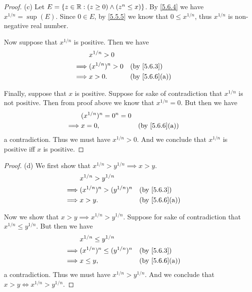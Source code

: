 \begin{proof}{(c)}
  Let \(E = \{z \in \mathbb{R} : (z \geq 0) \land (z^n \leq x)\}\).
  By \cref{5.6.4} we have \(x^{1 / n} = \sup(E)\).
  Since \(0 \in E\), by \cref{5.5.5} we know that \(0 \leq x^{1 / n}\), thus \(x^{1 / n}\) is non-negative real number.

  Now suppose that \(x^{1 / n}\) is positive.
  Then we have
  \begin{align*}
             & x^{1 / n} > 0                                      \\
    \implies & (x^{1 / n})^n > 0 &  & \text{(by \cref{5.6.3})}    \\
    \implies & x > 0.            &  & \text{(by \cref{5.6.6}(a))} \\
  \end{align*}

  Finally, suppose that \(x\) is positive.
  Suppose for sake of contradiction that \(x^{1 / n}\) is not positive.
  Then from proof above we know that \(x^{1 / n} = 0\).
  But then we have
  \begin{align*}
             & (x^{1 / n})^n = 0^n = 0                                  \\
    \implies & x = 0,                  &  & \text{(by \cref{5.6.6}(a))}
  \end{align*}
  a contradiction.
  Thus we must have \(x^{1 / n} > 0\).
  And we conclude that \(x^{1 / n}\) is positive iff \(x\) is positive.
\end{proof}

\begin{proof}{(d)}
  We first show that \(x^{1 / n} > y^{1 / n} \implies x > y\).
  \begin{align*}
             & x^{1 / n} > y^{1 / n}                                          \\
    \implies & (x^{1 / n})^n > (y^{1 / n})^n &  & \text{(by \cref{5.6.3})}    \\
    \implies & x > y.                        &  & \text{(by \cref{5.6.6}(a))}
  \end{align*}

  Now we show that \(x > y \implies x^{1 / n} > y^{1 / n}\).
  Suppose for sake of contradiction that \(x^{1 / n} \leq y^{1 / n}\).
  But then we have
  \begin{align*}
             & x^{1 / n} \leq y^{1 / n}                                          \\
    \implies & (x^{1 / n})^n \leq (y^{1 / n})^n &  & \text{(by \cref{5.6.3})}    \\
    \implies & x \leq y,                        &  & \text{(by \cref{5.6.6}(a))}
  \end{align*}
  a contradiction.
  Thus we must have \(x^{1 / n} > y^{1 / n}\).
  And we conclude that \(x > y \iff x^{1 / n} > y^{1 / n}\).
\end{proof}

